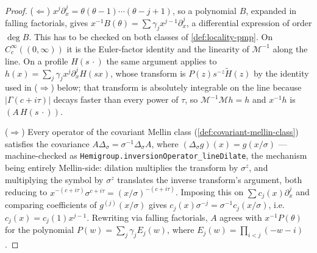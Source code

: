 \begin{proof}
\leanok
($\Leftarrow$) $x^{j}\partial_x^{j} = \theta(\theta-1)\cdots(\theta - j + 1)$, so a polynomial
$B$, expanded in falling factorials, gives $x^{-1}B(\theta) = \sum \gamma_j x^{j-1}\partial_x^j$,
a differential expression of order $\deg B$. This has to be checked on both classes of
\ref{def:locality-pmp}. On $C_c^\infty((0,\infty))$ it is the Euler-factor identity and the
linearity of $\mathcal{M}^{-1}$ along the line. On a profile $H(s\,\cdot)$ the same argument
applies to $h(x) = \sum_j\gamma_j x^j\partial_x^j H(sx)$, whose transform is $P(z)s^{-z}\tilde
H(z)$ by the identity used in ($\Rightarrow$) below; that transform is absolutely integrable on
the line because $|\Gamma(c+i\tau)|$ decays faster than every power of $\tau$, so
$\mathcal{M}^{-1}\mathcal{M}h = h$ and $x^{-1}h$ is $(A\,H(s\,\cdot))$.

($\Rightarrow$) Every operator of the covariant Mellin class (\ref{def:covariant-mellin-class})
satisfies the covariance
$A\Delta_\sigma = \sigma^{-1}\Delta_\sigma A$, where $(\Delta_\sigma g)(x) = g(x/\sigma)$ ---
machine-checked as \texttt{Hemigroup.inversionOperator\_lineDilate}, the mechanism being entirely
Mellin-side: dilation multiplies the transform by $\sigma^{z}$, and multiplying the symbol by
$\sigma^{z}$ translates the inverse transform's argument, both reducing to
$x^{-(c+i\tau)}\sigma^{c+i\tau} = (x/\sigma)^{-(c+i\tau)}$.
Imposing this on $\sum c_j(x)\partial_x^j$ and comparing coefficients of $g^{(j)}(x/\sigma)$
gives $c_j(x)\sigma^{-j} = \sigma^{-1}c_j(x/\sigma)$, i.e.\ $c_j(x) = c_j(1)x^{j-1}$.
Rewriting via falling factorials, $A$ agrees with $x^{-1}P(\theta)$ for the polynomial
$P(w) = \sum_j \gamma_j E_j(w)$, where $E_j(w) = \prod_{i<j}(-w-i)$.


\end{proof}
